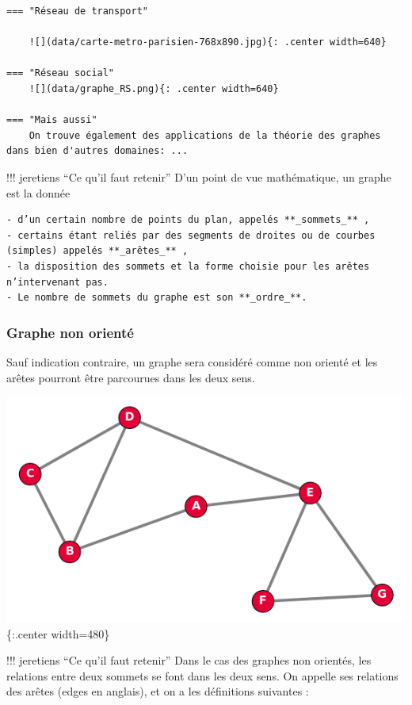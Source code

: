 \documentclass[
  letterpaper,
  DIV=11,
  numbers=noendperiod]{scrartcl}
\begin{document}
\begin{verbatim}
=== "Réseau de transport"

    ![](data/carte-metro-parisien-768x890.jpg){: .center width=640} 

=== "Réseau social"
    ![](data/graphe_RS.png){: .center width=640} 

=== "Mais aussi"
    On trouve également des applications de la théorie des graphes dans bien d'autres domaines: ...
\end{verbatim}

!!! jeretiens ``Ce qu'il faut retenir'' D'un point de vue mathématique,
un graphe est la donnée

\begin{verbatim}
- d’un certain nombre de points du plan, appelés **_sommets_** ,  
- certains étant reliés par des segments de droites ou de courbes     (simples) appelés **_arêtes_** ,  
- la disposition des sommets et la forme choisie pour les arêtes n’intervenant pas.  
- Le nombre de sommets du graphe est son **_ordre_**.  
\end{verbatim}

\hypertarget{graphe-non-orientuxe9}{%
\subsubsection{Graphe non orienté}\label{graphe-non-orientuxe9}}

Sauf indication contraire, un graphe sera considéré comme non orienté et
les arêtes pourront être parcourues dans les deux sens.

\includegraphics{data/exemple_graphe.png}\{:.center width=480\}

!!! jeretiens ``Ce qu'il faut retenir'' Dans le cas des graphes non
orientés, les relations entre deux sommets se font dans les deux sens.
On appelle ses relations des arêtes (edges en anglais), et on a les
définitions suivantes :
\end{document}
